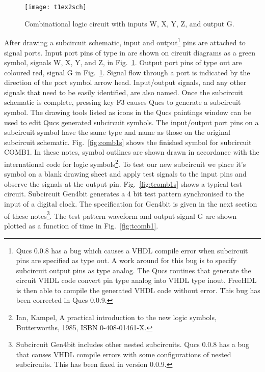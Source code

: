 \begin{figure}
  \centering
  \texttt{[image: t1ex2sch]}
  \caption{Combinational logic circuit with inputs W, X, Y, Z, and output G.}
  \label{fig:t1ex2sch}
\end{figure}

\addvspace{12pt}

After drawing a subcircuit schematic, input and output\footnote{Qucs
0.0.8 has a bug which causes a VHDL compile error when subcircuit pins
are specified as type out. A work around for this bug is to specify
subcircuit output pins as type analog.  The Qucs routines that
generate the circuit VHDL code convert pin type analog into VHDL type
inout. FreeHDL is then able to compile the generated VHDL code without
error. This bug has been corrected in Qucs 0.0.9.} pins are attached
to signal ports.  Input port pins of type in are shown on circuit
diagrams as a green symbol, signals W, X, Y, and Z, in
Fig.~\ref{fig:t1ex2sch}.  Output port pins of type out are coloured
red, signal G in Fig.~\ref{fig:t1ex2sch}. Signal flow through a port
is indicated by the direction of the port symbol arrow
head. Input/output signals, and any other signals that need to be
easily identified, are also named.  Once the subcircuit schematic is
complete, pressing key F3 causes Qucs to generate a subcircuit symbol.
The drawing tools listed as icons in the Qucs paintings window can be
used to edit Qucs generated subcircuit symbols.  The input/output port
pins on a subcircuit symbol have the same type and name as those on
the original subcircuit schematic.  Fig.~\ref{fig:comb1s} shows the
finished symbol for subcircuit COMB1. In these notes, symbol outlines
are shown drawn in accordance with the international code for logic
symbols\footnote{Ian, Kampel, A practical introduction to the new
logic symbols, Butterworths, 1985, ISBN 0-408-01461-X.}. To test our
new subcircuit we place it's symbol on a blank drawing sheet and apply
test signals to the input pins and observe the signals at the output
pin.  Fig.~\ref{fig:tcomb1s} shows a typical test circuit.  Subcircuit
Gen4bit generates a 4 bit test pattern synchronised to the input of a
digital clock. The specification for Gen4bit is given in the next
section of these notes\footnote{Subcircuit Gen4bit includes other
nested subcircuits.  Qucs 0.0.8 has a bug that causes VHDL compile
errors with some configurations of nested subcircuits. This has been
fixed in version 0.0.9. }.  The test pattern waveform and output
signal G are shown plotted as a function of time in
Fig.~\ref{fig:tcomb1}.


